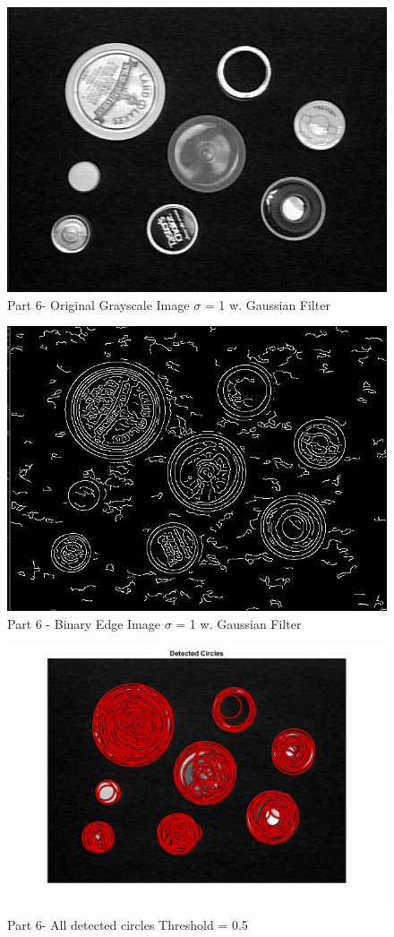 \documentclass[12pt]{article}
\begin{document}
\begin{figure}
	\centering
	\includegraphics[width=0.7\linewidth]{original_grayscale_image_2024-02-17_140115}
	\caption{Part 6- Original Grayscale Image $\sigma$ = 1 w. Gaussian Filter }
	\label{fig:originalgrayscaleimage2024-02-17140115}
\end{figure}
\begin{figure}
	\centering
	\includegraphics[width=0.7\linewidth]{binary_edge_image_2024-02-17_140115}
	\caption{Part 6 - Binary Edge Image $\sigma$ = 1 w. Gaussian Filter}
\end{figure}
\begin{figure}
	\centering
	\includegraphics[width=0.7\linewidth]{all_detected_circles_2024-02-17_140115}
	\caption{Part 6- All detected circles Threshold = 0.5}
	\label{fig:alldetectedcircles2024-02-17140115}
\end{figure}
\end{document}
